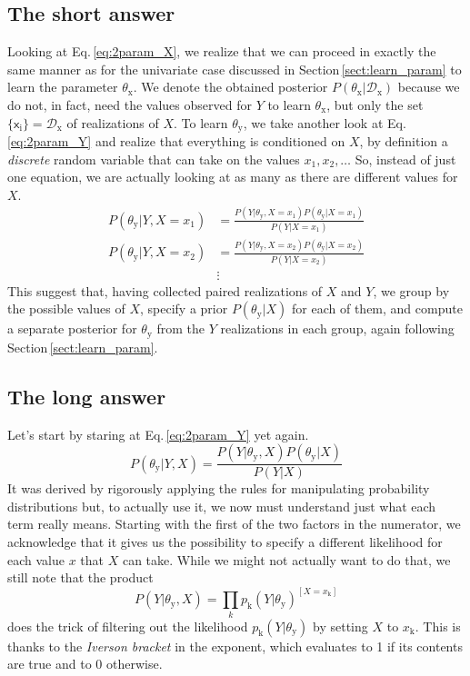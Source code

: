 \documentclass[]{report}
\begin{document}
\subsection{The short answer}
Looking at Eq.\,\ref{eq:2param_X}, we realize that we can proceed in exactly the same manner as for the univariate case discussed in Section\,\ref{sect:learn_param} to learn the parameter $\theta_\mathrm{x}$. We denote the obtained posterior $P( \theta_\mathrm{x} | \mathcal{D}_\mathrm{x} ) $ because we do not, in fact, need the values observed for $Y$ to learn $\theta_\mathrm{x}$, but only the set $\{\mathsf{x}_\mathrm{i}\} = \mathcal{D}_\mathrm{x}$ of realizations of $X$. To learn $\theta_\mathrm{y}$, we take another look at Eq.\,\ref{eq:2param_Y} and realize that everything is conditioned on $X$, by definition a \emph{discrete} random variable that can take on the values $x_1, x_2, \ldots$ So, instead of just one equation, we are actually looking at as many as there are different values for $X$.
\begin{align}
P( \theta_\mathrm{y} | Y, X = x_1 )
&= 
\frac
	{
		P( Y | \theta_\mathrm{y}, X = x_1 )
		P( \theta_\mathrm{y} | X = x_1 )
	}
	{
		P( Y | X = x_1 )
	}
\nonumber \\
P( \theta_\mathrm{y} | Y, X = x_2 )
&=
\frac
	{
		P( Y | \theta_\mathrm{y}, X = x_2 )
		P( \theta_\mathrm{y} | X = x_2 )
	}
	{
		P( Y | X=x_2 )
	}
\\
&\vdots
\nonumber
\end{align}
This suggest that, having collected paired realizations of $X$ and $Y$, we group by the possible values of $X$, specify a prior $P( \theta_\mathrm{y} | X ) $ for each of them, and compute a separate posterior for $\theta_\mathrm{y}$ from the $Y$ realizations in each group, again following Section\,\ref{sect:learn_param}.


\subsection{The long answer}
Let's start by staring at Eq.\,\ref{eq:2param_Y} yet again.
\begin{equation*}
P( \theta_\mathrm{y} | Y, X ) 
=
\frac
	{
		P( Y | \theta_\mathrm{y}, X )
		P( \theta_\mathrm{y} | X )
	}
	{
		P( Y | X )
	}
\end{equation*}
It was derived by rigorously applying the rules for manipulating probability distributions but, to actually use it, we now must understand just what each term really means. Starting with the first of the two factors in the numerator, we acknowledge that it gives us the possibility to specify a different likelihood for each value $x$ that $X$ can take. While we might not actually want to do that, we still note that the product
\begin{equation} \label{eq:2param_likelihood_Y}
P( Y | \theta_\mathrm{y}, X ) 
=
\prod_{k}
	{
		p_\mathrm{k}( Y | \theta_\mathrm{y} )
	}^{
		[ X = x_\mathrm{k} ]
	}
\end{equation} 
does the trick of filtering out the likelihood $p_\mathrm{k}( Y | \theta_\mathrm{y} ) $ by setting $X$ to $x_\mathrm{k}$. This is thanks to the \emph{Iverson bracket} in the exponent, which evaluates to 1 if its contents are true and to 0 otherwise.
\end{document}
